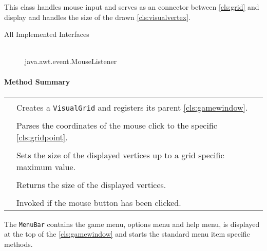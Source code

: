 This class handles mouse input and serves as an connector between \ref{cls:grid} and display and handles the size of the drawn \ref{cls:visualvertex}. \\ 
\begin{description}
	\item[All Implemented Interfaces] \hfill \\
	java.awt.event.MouseListener
\end{description}
\centerdash

\paragraph*{Method Summary}
\paragraph*{}
\begin{longtable}{Lp{10cm}}
	\startmethodtable
	 \\
	& Creates a \texttt{VisualGrid} and registers its parent \ref{cls:gamewindow}. \\
	 \\
	& Parses the coordinates of the mouse click to the specific \ref{cls:gridpoint}. \\
	 \\
	& Sets the size of the displayed vertices up to a grid specific maximum value. \\
	 \\
	& Returns the size of the displayed vertices. \\ 
	 \\
	& Invoked if the mouse button has been clicked. \\ 
	\hline
\end{longtable}


The \texttt{MenuBar} contains the game menu, options menu and help menu, is displayed at the top of the \ref{cls:gamewindow} and starts the standard menu item specific methods. \\

